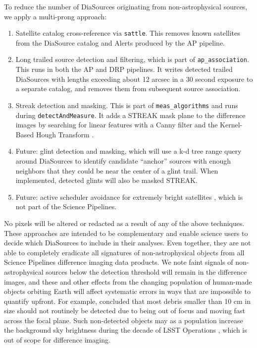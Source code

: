 To reduce the number of DiaSources originating from non-astrophysical sources, we apply a multi-prong approach:

\begin{enumerate}
\item Satellite catalog cross-reference via \texttt{sattle}.
This removes known satellites from the DiaSource catalog and Alerts produced by the AP pipeline.

\item Long trailed source detection and filtering, which is part of \texttt{ap\_association}.
This runs in both the AP and DRP pipelines. It writes detected trailed DiaSources with lengths exceeding about 12 arcsec in a 30 second exposure to a separate catalog, and removes them from subsequent source association.

\item Streak detection and masking.
This is part of \texttt{meas\_algorithms} and runs during \texttt{detectAndMeasure}.
It adds a STREAK mask plane to the difference images by searching for linear features with a Canny filter and the Kernel-Based Hough Transform \citep{FernandesOliveira08}.

\item Future: glint detection and masking, which will use a k-d tree range query around DiaSources to identify candidate ``anchor'' sources with enough neighbors that they could be near the center of a glint trail.
When implemented, detected glints will also be masked STREAK.

\item Future: active scheduler avoidance for extremely bright satellites \citep{Hu22}, which is not part of the Science Pipelines.
\end{enumerate}

No pixels will be altered or redacted as a result of any of the above techniques.
These approaches are intended to be complementary and enable science users to decide which DiaSources to include in their analyses.
Even together, they are not able to completely eradicate all signatures of non-astrophysical objects from all Science Pipelines difference imaging data products.
We note faint signals of non-astrophysical sources below the detection threshold will remain in the difference images, and these and other effects from the changing population of human-made objects orbiting Earth will affect systematic errors in ways that are impossible to quantify upfront.
For example, \citet{Tyson24} concluded that most debris smaller than 10 cm in size should not routinely be detected due to being out of focus and moving fast across the focal plane.
Such non-detected objects may as a population increase the background sky brightness during the decade of LSST Operations \citep{Kocifaj21,Barentine23}, which is out of scope for difference imaging.
